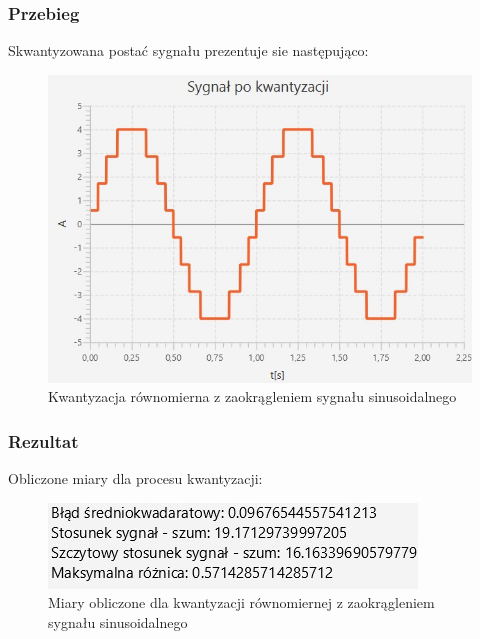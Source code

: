 \documentclass[12pt]{article}
\begin{document}
\subsubsection{Przebieg}
Skwantyzowana postać sygnału prezentuje sie następująco:
\begin{figure}[H]
	\centering
	\includegraphics[width=\linewidth]{sygnal_kwantyzacja_z_zaokragleniem.jpg}
	\caption{Kwantyzacja równomierna z zaokrągleniem sygnału sinusoidalnego}
	\label{wykres dla eksperymentu 2}
\end{figure}

\subsubsection{Rezultat}
Obliczone miary dla procesu kwantyzacji:
\begin{figure}[H]
	\centering
	\includegraphics[width=\linewidth]{wyniki_kwantyzacja_z_zaokragleniem.jpg}
	\caption{Miary obliczone dla kwantyzacji równomiernej z zaokrągleniem sygnału sinusoidalnego}
	\label{Wartości dla eksperymentu 2}
\end{figure}


\end{document}
